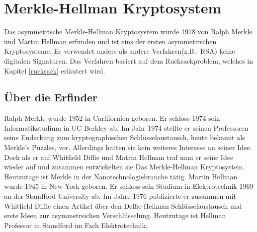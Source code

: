 \documentclass[a4paper,12pt,titlepage]{article}
\begin{document}
\section{Merkle-Hellman Kryptosystem}
Das asymmetrische Merkle-Hellman Kryptosystem wurde 1978 von Ralph Merkle und Martin Hellman erfunden und ist eins der ersten asymmetrischen Kryptosysteme. Es verwendet anders als andere Verfahren(z.B.: RSA) keine digitalen Signaturen. Das Verfahren basiert auf dem Rucksackproblem, welches in Kapitel \ref{rucksack} erläutert wird.

\subsection{Über die Erfinder}
Ralph Merkle wurde 1952 in Carlifornien geboren. Er schloss 1974 sein Informatikstudium in UC Berkley ab.
Im Jahr 1974 stellte er seinen Professoren seine Endeckung zum kryptographischen Schlüsselaustausch, heute bekannt als Merkle's Puzzles, vor. Allerdings hatten sie kein weiteres Interesse an seiner Idee. Doch als er auf Whitfield Diffie und Matrin Hellman traf nam er seine Idee wieder auf und zusammen entwickelten sie Das Merkle-Hellman Kryptosystem. Heutzutage ist Merkle in der Nanotechnologiebranche tätig.  \newline
Martin Hellman wurde 1945 in New York geboren. Er schloss sein Studium in Elektrotechnik 1969 an der Standford University ab. Im Jahre 1976 publizierte er zusammen mit Whitfield Diffie einen Artikel über den Deffie-Hellman Schlüsselaustausch und erste Ideen zur asymmetrsichen Verschlüsselung.
Heutzutage ist Hellman Professor in Standford im Fach Elektrotechnik.
\end{document}
